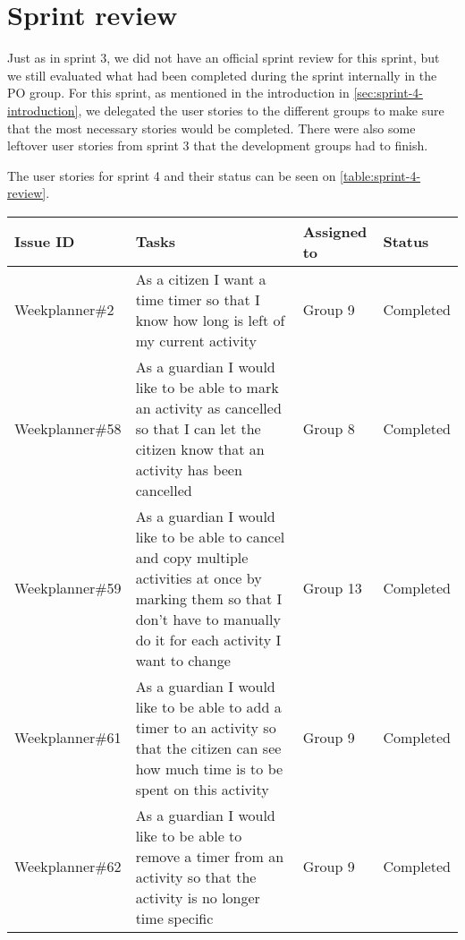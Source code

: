 \section{Sprint review}
Just as in sprint 3, we did not have an official sprint review for this sprint, but we still evaluated what had been completed during the sprint internally in the PO group.
For this sprint, as mentioned in the introduction in \autoref{sec:sprint-4-introduction}, we delegated the user stories to the different groups to make sure that the most necessary stories would be completed. There were also some leftover user stories from sprint 3 that the development groups had to finish.

The user stories for sprint 4 and their status can be seen on \autoref{table:sprint-4-review}.
\begin{longtable}{|p{2.9cm}|p{8cm}|p{2cm}|p{2cm}|}
    \hline
    Issue ID        & Tasks                                                                                                                                                                                    & Assigned to  & Status   \\ \hline
    Weekplanner\#2 & As a citizen I want a time timer so that I know how long is left of my current activity                                                                                                   & Group 9      & Completed  \\ \hline
    Weekplanner\#58 & As a guardian I would like to be able to mark an activity as cancelled so that I can let the citizen know that an activity has been cancelled                                            & Group 8      & Completed   \\ \hline
    Weekplanner\#59 & As a guardian I would like to be able to cancel and copy multiple activities at once by marking them so that I don't have to manually do it for each activity I want to change           & Group 13     & Completed   \\ \hline
    Weekplanner\#61 & As a guardian I would like to be able to add a timer to an activity so that the citizen can see how much time is to be spent on this activity                                            & Group 9      & Completed    \\ \hline
    Weekplanner\#62 & As a guardian I would like to be able to remove a timer from an activity so that the activity is no longer time specific                                                                 & Group 9      & Completed    \\ \hline

\end{longtable}
